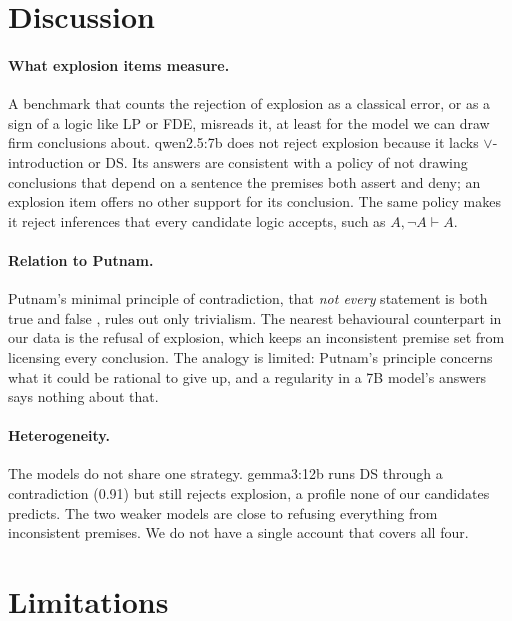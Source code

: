\documentclass[11pt]{article}
\begin{document}
\section{Discussion}

\paragraph{What explosion items measure.}
A benchmark that counts the rejection of explosion as a classical error, or as a sign of a logic like LP
or FDE, misreads it, at least for the model we can draw firm conclusions about. qwen2.5:7b does not reject
explosion because it lacks $\lor$-introduction or DS. Its answers are consistent with a policy of not
drawing conclusions that depend on a sentence the premises both assert and deny; an explosion item offers
no other support for its conclusion. The same policy makes it reject inferences that every candidate logic
accepts, such as $A, \neg A \vdash A$.

\paragraph{Relation to Putnam.}
Putnam's minimal principle of contradiction, that \emph{not every} statement is both true and false
\citep{putnam1978}, rules out only trivialism. The nearest behavioural counterpart in our data is the
refusal of explosion, which keeps an inconsistent premise set from licensing every conclusion. The analogy
is limited: Putnam's principle concerns what it could be rational to give up, and a regularity in a 7B
model's answers says nothing about that.

\paragraph{Heterogeneity.}
The models do not share one strategy. gemma3:12b runs DS through a contradiction (0.91) but still
rejects explosion, a profile none of our candidates predicts. The two weaker models are close to
refusing everything from inconsistent premises. We do not have a single account that covers all four.

\section{Limitations}
\end{document}
